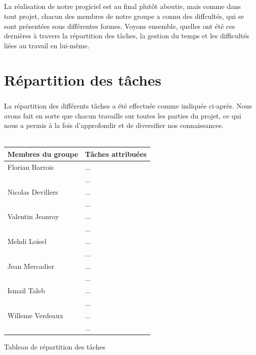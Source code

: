\documentclass[a4paper,10pt]{report}
\begin{document}
      \paragraph{}
	  La réalisation de notre progiciel est au final plutôt aboutie, mais comme dans tout projet, chacun des membres de notre groupe a connu des diffcultés, qui se sont présentées sous différentes formes.
	  Voyons ensemble, quelles ont été ces dernières à travers la répartition des tâches, la gestion du temps et les difficultés liées au travail en lui-même.
	
  \chapter{Répartition des tâches}
    \paragraph{}
      La répartition des différents tâches a été effectuée comme indiquée ci-après.
      Nous avons fait en sorte que chacun travaille sur toutes les parties du projet, ce qui nous a permis à la fois d'approfondir et de diversifier nos connaissances.
      ~\\
      ~\\
      \begin{center}
	\begin{tabular}{|l|l|}
	  \hline
	  Membres du groupe & Tâches attribuées \\
	  \hline
	    Florian Barrois & ... \\
	    & ... \\
	  \hline
	    Nicolas Devillers & ... \\
	    & ...\\
	    \hline
	    Valentin Jeanroy & ... \\
	    & ...\\
	    \hline
	    Mehdi Loisel & ... \\
	    & ...\\
	    \hline
	    Jean Mercadier & ... \\
	    & ...\\
	    \hline
	    Ismail Taleb & ... \\
	    & ...\\
	    \hline
	    Willeme Verdeaux & ... \\
	    & ...\\
	  \hline
	\end{tabular}
	
	Tableau de répartition des tâches
      \end{center}
      
\end{document}
